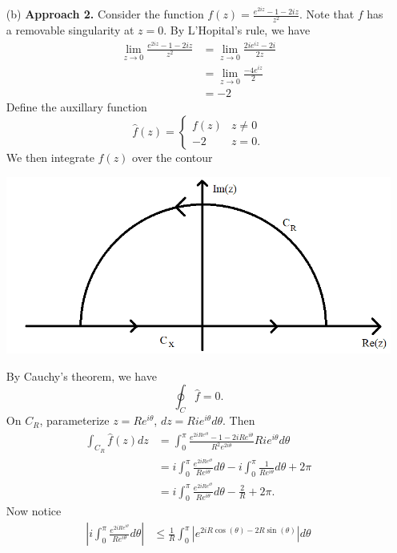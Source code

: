 \documentclass{article}
\begin{document}
\begin{itemize}
    \item[(b)] \textbf{Approach 2.} Consider the function $f(z) = \frac{e^{2iz} - 1 - 2iz}{z^2}$. Note that $f$ has a removable singularity at $z = 0$. By L'Hopital's rule, we have
    \begin{align*}
        \lim_{z \to 0}\frac{e^{2iz} - 1 - 2iz}{z^2} &=\lim_{z \to 0} \frac{2ie^{iz} - 2i}{2z}\\
        &= \lim_{z\to 0} \frac{-4e^{iz}}{2}\\
        &= -2
    \end{align*}
    Define the auxillary function
    \[\hat{f}(z) = \begin{cases}
        f(z) & z \neq 0\\
        -2 & z = 0.
    \end{cases}\]
    We then integrate $\hat{f}(z)$ over the contour
    \begin{center}
        \includegraphics[scale = 0.4]{contour2.PNG}
    \end{center}
    By Cauchy's theorem, we have
    \[\oint_{C}\hat{f} = 0.\]
    On $C_R$, parameterize $z = Re^{i\theta}$, $dz = Rie^{i\theta}d\theta$. Then 
    \begin{align*}
        \int_{C_R} \hat{f}(z)dz &= \int_0^{\pi}\frac{e^{2iRe^{i\theta}} - 1 - 2iRe^{i\theta}}{R^2e^{2i\theta}}Rie^{i\theta}d\theta\\
        &= i\int_0^{\pi} \frac{e^{2iRe^{i\theta}}}{Re^{i\theta}}d\theta - i\int_0^{\pi}\frac{1}{Re^{i\theta}}d\theta + 2\pi\\
        &= i\int_0^{\pi}\frac{e^{2iRe^{i\theta}}}{Re^{i\theta}}d\theta - \frac{2}{R} + 2\pi.
    \end{align*}
    Now notice 
    \begin{align*}
        \left|i\int_0^{\pi}\frac{e^{2iRe^{i\theta}}}{Re^{i\theta}}d\theta\right| &\leq \frac{1}{R}\int_0^{\pi} \left|e^{2iR\cos(\theta) - 2R\sin(\theta)}\right|d\theta\\

\end{align*}
\end{itemize}
\end{document}
